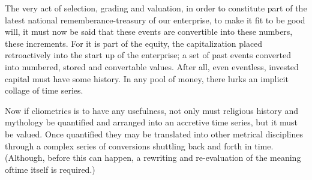 The very act of selection, grading and valuation, in order to constitute part of the latest national rememberance-treasury of our enterprise, to make it fit to be good will, it must now be said that these events are convertible into these numbers, these increments. For it is part of the equity, the capitalization placed retroactively into the start up of the enterprise; a set of past events converted into numbered, stored and convertable values. After all, even eventless, invested capital must have some history. In any pool of money, there lurks an implicit collage of time series.

Now if cliometrics is to have any usefulness, not only must religious history and mythology be quantified and arranged into an accretive time series, but it must be valued. Once quantified they may be translated into other metrical disciplines through a complex series of conversions shuttling back and forth in time. (Although, before this can happen, a rewriting and re-evaluation of the meaning oftime itself is required.)
